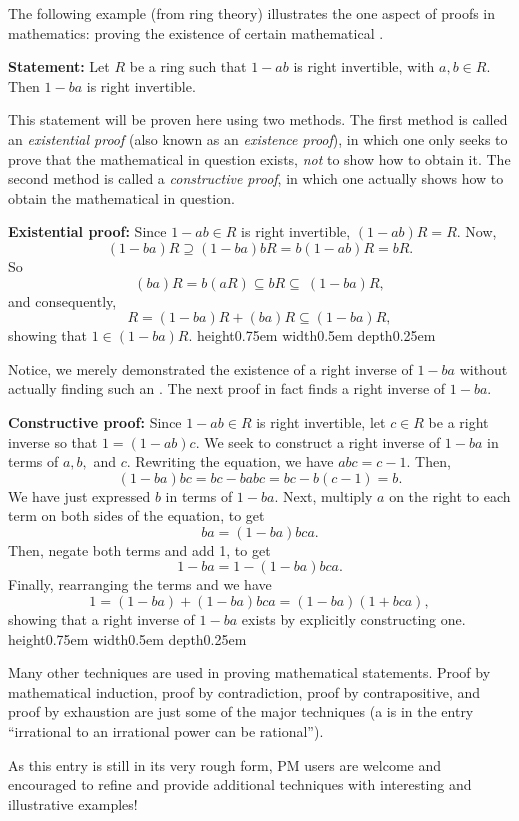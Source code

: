 \documentclass[12pt]{article}
\newcommand{\qed}{\nobreak \ifvmode \relax \else
      \ifdim\lastskip<1.5em \hskip-\lastskip
      \hskip1.5em plus0em minus0.5em \fi \nobreak
      \vrule height0.75em width0.5em depth0.25em\fi}
\begin{document}

The following example (from ring theory) illustrates the one aspect of proofs in mathematics: proving the existence of certain mathematical .
\par
\textbf{Statement:} Let $R$ be a ring such that $1-ab$ is right invertible, with $a,b\in R$.  Then $1-ba$ is right invertible.
\par
This statement will be proven here using two methods.  The first method is called an \emph{existential proof} (also known as an \emph{existence proof}), in which one only seeks to prove that the mathematical  in question exists, \emph{not} to show how to obtain it.  The second method is called a \emph{constructive proof}, in which one actually shows how to obtain the mathematical  in question.
\par
\textbf{Existential proof:}
Since $1-ab\in R$ is right invertible, $(1-ab)R=R$.  Now, $$(1-ba)R\supseteq(1-ba)bR=b(1-ab)R=bR.$$  So $$(ba)R=b(aR)\subseteq bR\subseteq\ (1-ba)R,$$ and consequently, $$R=(1-ba)R+(ba)R\subseteq (1-ba)R,$$ showing that $1\in(1-ba)R$.  \qed
\par
Notice, we merely demonstrated the existence of a right inverse of $1-ba$ without actually finding such an .  The next proof in fact finds a right inverse of $1-ba$.
\par
\textbf{Constructive proof:}
Since $1-ab\in R$ is right invertible, let $c\in R$ be a right inverse so that $1=(1-ab)c$.  We seek to construct a right inverse of $1-ba$ in terms of $a,b,$ and $c$.  Rewriting the equation, we have $abc=c-1$.  Then, $$(1-ba)bc=bc-babc=bc-b(c-1)=b.$$  We have just expressed $b$ in terms of $1-ba$.  Next, multiply $a$ on the right to each term on both sides of the equation, to get $$ba=(1-ba)bca.$$  Then, negate both terms and add 1, to get 
$$1-ba=1-(1-ba)bca.$$  Finally, rearranging the terms and we have $$1=(1-ba)+(1-ba)bca=(1-ba)(1+bca),$$ showing that 
a right inverse of $1-ba$ exists by explicitly constructing one.  \qed\\
\par
Many other techniques are used in proving mathematical statements.  Proof by mathematical induction, proof by contradiction, proof by contrapositive, and proof by exhaustion are just some of the major techniques (a  is in the entry ``irrational to an irrational power can be rational'').
\par
As this entry is still in its very rough form, PM users are welcome and encouraged to refine and provide additional techniques with interesting and illustrative examples!
\end{document}
